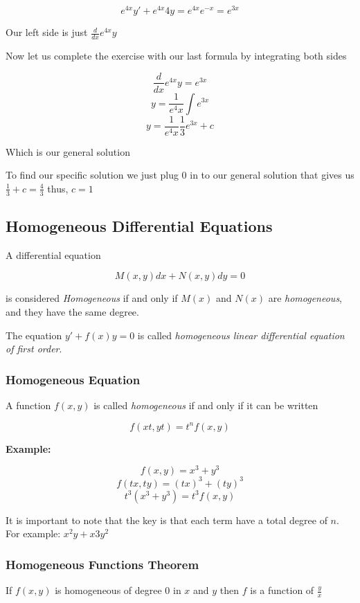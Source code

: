 \[
    e^{4x}y' + e^{4x}4y = e^{4x}e^{-x} = e^{3x}
\]

Our left side is just \(\frac{d}{dx} e^{4x}y\)

Now let us complete the exercise with our last formula by integrating both sides

\[
    \frac{d}{dx} e^{4x}y = e^{3x}
\]
\[
    y = \frac{1}{e^4x}\int e^{3x}
\]
\[
    y = \frac{1}{e^4x} \frac{1}{3}e^{3x} + c
\]

Which is our general solution

To find our specific solution we just plug 0 in to our general solution that gives us
\(\frac{1}{3} + c = \frac{4}{3}\) thus, \(c = 1\)

\subsection{Homogeneous Differential Equations}

A differential equation 

\[
    M(x,y)dx + N(x,y)dy = 0
\]

is considered \emph{Homogeneous} if and only if
\(M(x)\) and \(N(x)\) are \emph{homogeneous}, and they have the same degree.

The equation \(y' + f(x)y = 0\) is called \emph{homogeneous linear differential equation of first order}.

\subsubsection{Homogeneous Equation}

A function \(f(x,y)\) is called \emph{homogeneous} if and only if it can be written

\[
    f(xt, yt) = t^n f(x,y)
\]

\textbf{Example: }

\[
    f(x,y) = x^3 + y^3
\]
\[
    f(tx, ty) = {(tx)}^3 + {(ty)}^3
\]
\[
    t^3 (x^3 + y^3) = t^3 f(x,y)
\]

It is important to note that the key is that each term have a total degree of \(n\).
For example: \(x^2y + x3y^2\)

\subsubsection{Homogeneous Functions Theorem}

If \(f(x,y)\) is homogeneous of degree \(0\) in \(x\) and \(y\) then 
\(f\) is a function of \(\frac{y}{x}\)


